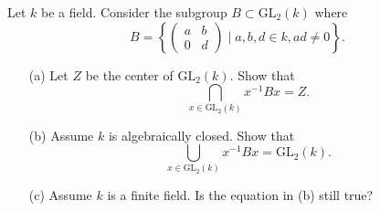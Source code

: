 \begin{prob}[S2008-Q1]
    Let \(k\) be a field. Consider the subgroup \(B \subset \text{GL}_2(k)\) where
    \[B = \left\{ \begin{pmatrix} a & b \\ 0 & d \end{pmatrix} \mid a, b, d \in k, ad \neq 0 \right\}.\]
    \begin{itemize}
        \item[(a)] Let \(Z\) be the center of \(\text{GL}_2(k)\). Show that
        \[\bigcap_{x \in \text{GL}_2(k)} x^{-1} Bx = Z.\]
        \item[(b)] Assume \(k\) is algebraically closed. Show that
        \[\bigcup_{x \in \text{GL}_2(k)} x^{-1} Bx = \text{GL}_2(k).\]
        \item[(c)] Assume \(k\) is a finite field. Is the equation in (b) still  true?
    \end{itemize}
\end{prob}
